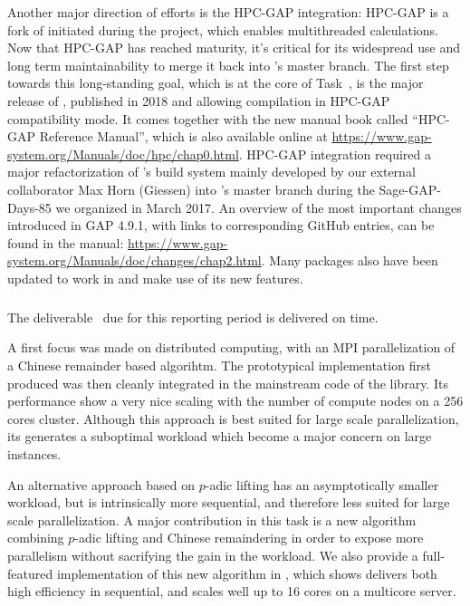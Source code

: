Another major direction of efforts is the HPC-GAP integration:
HPC-GAP is a fork of \GAP initiated during the \scienceproject project, which
enables multithreaded calculations. Now that HPC-GAP has reached
maturity, it's critical for its widespread use and long term
maintainability to merge it back into \GAP's master branch.
The first step towards this long-standing goal, which is at the core of
Task~, is the major release of , published in 2018 and allowing compilation in HPC-GAP
compatibility mode. It comes together with the new manual book called ``HPC-GAP Reference Manual'',
which is also available online at \url{https://www.gap-system.org/Manuals/doc/hpc/chap0.html}.
HPC-GAP integration required a major
refactorization of \GAP's build system
mainly developed by our external collaborator Max Horn (Giessen) into \GAP's master
branch during the Sage-GAP-Days-85 we organized in March 2017. 
An overview of the most important changes introduced in GAP 4.9.1,
with links to corresponding GitHub entries,
can be found in the \GAP manual: \url{https://www.gap-system.org/Manuals/doc/changes/chap2.html}.
Many \GAP packages also have been updated to work in  and make use of its new features.

\subparagraph{}
  \label{hpc@hpc-linbox}

The deliverable~ due for this reporting period is
delivered on time.

A first focus was made on distributed computing, with an MPI parallelization of a Chinese remainder based
algorihtm. The prototypical implementation first produced was then cleanly integrated in the mainstream code of the
library. Its performance show a very nice scaling with the number of compute nodes on a 256 cores cluster. Although this
approach is best suited for large scale parallelization, its generates a suboptimal workload which become a major
concern on large instances.

An alternative approach based on $p$-adic lifting has an  asymptotically smaller workload, but is intrinsically more
sequential, and therefore less suited for large scale parallelization. 
A major contribution in this task is a new algorithm combining $p$-adic lifting and Chinese remaindering in order to
expose more parallelism without sacrifying the gain in the workload.
We also provide a full-featured  implementation of this new algorithm in \Linbox, which shows delivers both high
efficiency in sequential, and scales well up to 16 cores on a multicore server.

